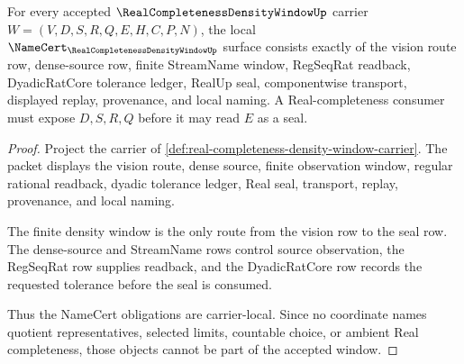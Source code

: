 \begin{theorem}
\label{thm:real-completeness-density-window-namecert-obligations}
For every accepted $\RealCompletenessDensityWindowUp$ carrier $W=(V,D,S,R,Q,E,H,C,P,N)$, the local $\NameCert_{\RealCompletenessDensityWindowUp}$ surface consists exactly of the vision route row, dense-source row, finite StreamName window, RegSeqRat readback, DyadicRatCore tolerance ledger, RealUp seal, componentwise transport, displayed replay, provenance, and local naming. A Real-completeness consumer must expose $D,S,R,Q$ before it may read $E$ as a seal.
\end{theorem}
\begin{proof}
Project the carrier of \autoref{def:real-completeness-density-window-carrier}. The packet displays the vision route, dense source, finite observation window, regular rational readback, dyadic tolerance ledger, Real seal, transport, replay, provenance, and local naming.

The finite density window is the only route from the vision row to the seal row. The dense-source and StreamName rows control source observation, the RegSeqRat row supplies readback, and the DyadicRatCore row records the requested tolerance before the seal is consumed.

Thus the NameCert obligations are carrier-local. Since no coordinate names quotient representatives, selected limits, countable choice, or ambient Real completeness, those objects cannot be part of the accepted window.
\end{proof}

